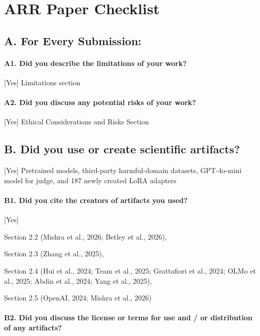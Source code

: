 \documentclass{article}
\begin{document}




\clearpage
\appendix
\iffalse
\section*{ARR Paper Checklist}
\subsection*{A. For Every Submission: }

\paragraph*{A1. Did you describe the limitations of your work?}

[Yes] Limitations section
\paragraph{A2. Did you discuss any potential risks of your work?}

[Yes] Ethical Considerations and Risks Section
\subsection*{B. Did you use or create scientific artifacts? }

[Yes] Pretrained models, third-party harmful-domain datasets, GPT-4o-mini model for judge, and 187 newly created LoRA adapters
\paragraph*{B1. Did you cite the creators of artifacts you used?}

[Yes]

Section 2.2 (Mishra et al., 2026; Betley et al., 2026),

Section 2.3 (Zhang et al., 2025),

Section 2.4 (Hui et al., 2024; Team et al., 2025;
Grattafiori et al., 2024; OLMo et al., 2025; Abdin et al.,
2024; Yang et al., 2025),

Section 2.5 (OpenAI, 2024; Mishra et al., 2026)

\paragraph{B2. Did you discuss the license or terms for use and / or distribution of any artifacts?}
\end{document}
